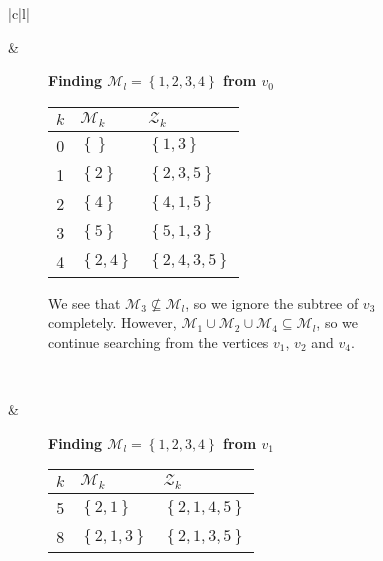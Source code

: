 \begin{figure}[H]
    \centering
    \begin{tabular}[t]{|c|l|}\hline
    \begin{subfigure}[b]{0.35\textwidth}
        \centering
        
    \end{subfigure}
    & 
    \begin{subfigure}[b]{0.64\textwidth}
        \textbf{Finding $\mathcal{M}_l = \left\{{1,2,3,4}\right\}$ from $v_0$} \\
        \begin{tabular}{rll}
            $k$ & $\mathcal{M}_k$            & $\mathcal{Z}_k$ \\ \hline
            0        & $\left\{{}\right\}$        & $\left\{{1,3}\right\}$ \\ 
            1        & $\left\{{2}\right\}$       & $\left\{{2,3,5}\right\}$ \\ 
            2        & $\left\{{4}\right\}$       & $\left\{{4,1,5}\right\}$ \\ 
            3        & $\left\{{5}\right\}$       & $\left\{{5,1,3}\right\}$ \\ 
            4        & $\left\{{2,4}\right\}$     & $\left\{{2,4,3,5}\right\}$ \\ 
        \end{tabular}

        We see that $\mathcal{M}_3 \not \subseteq \mathcal{M}_l$, so we ignore
        the subtree of $v_3$ completely. However, $\mathcal{M}_1 \cup
        \mathcal{M}_2 \cup \mathcal{M}_4 \subseteq \mathcal{M}_l$, so we
        continue searching from the vertices $v_1$, $v_2$ and $v_4$.
    \end{subfigure}
    \\ \hline
    \begin{subfigure}[b]{0.35\textwidth}
        \centering
        
    \end{subfigure}
    & 
    \begin{subfigure}[b]{0.64\textwidth}
        \textbf{Finding $\mathcal{M}_l = \left\{{1,2,3,4}\right\}$ from $v_1$} \\
        \begin{tabular}{rll}
            $k$ & $\mathcal{M}_k$            & $\mathcal{Z}_k$ \\ \hline
            5        & $\left\{{2,1}\right\}$     & $\left\{{2,1,4,5}\right\}$ \\ 
            8        & $\left\{{2,1,3}\right\}$   & $\left\{{2,1,3,5}\right\}$ \\ 
        \end{tabular}


\end{subfigure}
\end{tabular}
\end{figure}
